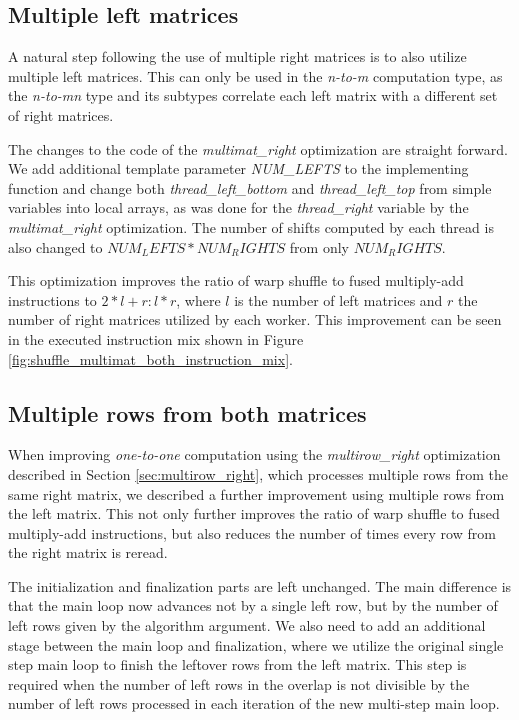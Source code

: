 \subsection{Multiple left matrices}
\label{sec:multimat_both}

A natural step following the use of multiple right matrices is to also utilize multiple left matrices. This can only be used in the \textit{n-to-m} computation type, as the \textit{n-to-mn} type and its subtypes correlate each left matrix with a different set of right matrices.

The changes to the code of the \textit{multimat\_right} optimization are straight forward. We add additional template parameter \textit{NUM\_LEFTS} to the implementing function and change both \textit{thread\_left\_bottom} and \textit{thread\_left\_top} from simple variables into local arrays, as was done for the \textit{thread\_right} variable by the \textit{multimat\_right} optimization. The number of shifts computed by each thread is also changed to $NUM_LEFTS * NUM_RIGHTS$ from only $NUM_RIGHTS$. 


This optimization improves the ratio of warp shuffle to fused multiply-add instructions to $ 2 * l + r : l * r$, where $l$ is the number of left matrices and $r$ the number of right matrices utilized by each worker. This improvement can be seen in the executed instruction mix shown in Figure \ref{fig:shuffle_multimat_both_instruction_mix}. 

\subsection{Multiple rows from both matrices}
\label{sec:multirow_both}

When improving \textit{one-to-one} computation using the \textit{multirow\_right} optimization described in Section \ref{sec:multirow_right}, which processes multiple rows from the same right matrix, we described a further improvement using multiple rows from the left matrix. This not only further improves the ratio of warp shuffle to fused multiply-add instructions, but also reduces the number of times every row from the right matrix is reread. 

The initialization and finalization parts are left unchanged. The main difference is that the main loop now advances not by a single left row, but by the number of left rows given by the algorithm argument. We also need to add an additional stage between the main loop and finalization, where we utilize the original single step main loop to finish the leftover rows from the left matrix. This step is required when the number of left rows in the overlap is not divisible by the number of left rows processed in each iteration of the new multi-step main loop.

